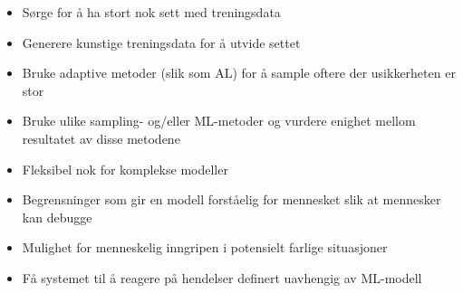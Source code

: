 \begin{itemize}
    \item Sørge for å ha stort nok sett med treningsdata
    \item Generere kunstige treningsdata for å utvide settet
    \item Bruke adaptive metoder (slik som AL) for å sample oftere der usikkerheten er stor
    \item Bruke ulike sampling- og/eller ML-metoder og vurdere enighet mellom resultatet av disse metodene
    \item Fleksibel nok for komplekse modeller
    \item Begrensninger som gir en modell forståelig for mennesket slik at mennesker kan debugge
    \item Mulighet for menneskelig inngripen i potensielt farlige situasjoner
    \item Få systemet til å reagere på hendelser definert uavhengig av ML-modell
\end{itemize}
